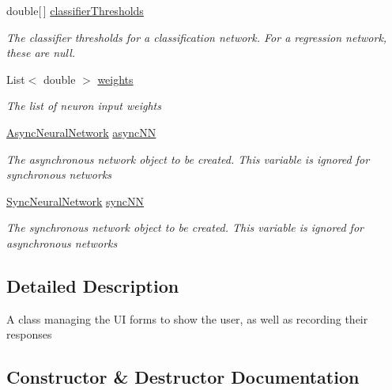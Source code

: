 \begin{DoxyCompactItemize}
double\mbox{[}$\,$\mbox{]} \hyperlink{class_n_n_gen_1_1_wizard_controller_a77607ae6650b0c79f9b503209badce0f}{classifier\+Thresholds}
\begin{DoxyCompactList}\small\item\em The classifier thresholds for a classification network. For a regression network, these are null. \end{DoxyCompactList}\item 
List$<$ double $>$ \hyperlink{class_n_n_gen_1_1_wizard_controller_a6978f46ec504d8be14ec6517959d131a}{weights}
\begin{DoxyCompactList}\small\item\em The list of neuron input weights \end{DoxyCompactList}\item 
\hyperlink{class_n_n_gen_1_1_async_neural_network}{Async\+Neural\+Network} \hyperlink{class_n_n_gen_1_1_wizard_controller_a5bc403949233d912bb2c93e2f43cbc25}{async\+N\+N}
\begin{DoxyCompactList}\small\item\em The asynchronous network object to be created. This variable is ignored for synchronous networks \end{DoxyCompactList}\item 
\hyperlink{class_n_n_gen_1_1_sync_neural_network}{Sync\+Neural\+Network} \hyperlink{class_n_n_gen_1_1_wizard_controller_a6231cf0c8041896d72a7225cc5cdef7f}{sync\+N\+N}
\begin{DoxyCompactList}\small\item\em The synchronous network object to be created. This variable is ignored for asynchronous networks \end{DoxyCompactList}\end{DoxyCompactItemize}


\subsection{Detailed Description}
A class managing the U\+I forms to show the user, as well as recording their responses 



\subsection{Constructor \& Destructor Documentation}
\hypertarget{class_n_n_gen_1_1_wizard_controller_ab4b572ad55d5e544cc65cbf850e4bcf8}{}
